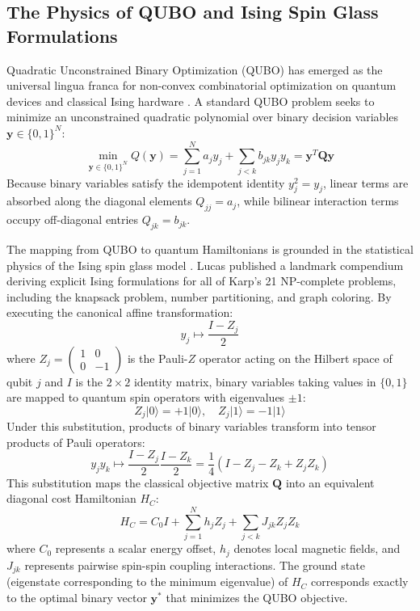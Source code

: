 \documentclass[11pt,a4paper]{article}
\theoremstyle{definition}
\theoremstyle{remark}
\begin{document}
\subsection{The Physics of QUBO and Ising Spin Glass Formulations}
Quadratic Unconstrained Binary Optimization (QUBO) has emerged as the universal lingua franca for non-convex combinatorial optimization on quantum devices and classical Ising hardware \cite{glover2019}. A standard QUBO problem seeks to minimize an unconstrained quadratic polynomial over binary decision variables $\mathbf{y} \in \{0, 1\}^N$:
\begin{equation}
\min_{\mathbf{y} \in \{0, 1\}^N} Q(\mathbf{y}) = \sum_{j=1}^N a_j y_j + \sum_{j < k} b_{jk} y_j y_k = \mathbf{y}^T \mathbf{Q} \mathbf{y}
\end{equation}
Because binary variables satisfy the idempotent identity $y_j^2 = y_j$, linear terms are absorbed along the diagonal elements $Q_{jj} = a_j$, while bilinear interaction terms occupy off-diagonal entries $Q_{jk} = b_{jk}$.

The mapping from QUBO to quantum Hamiltonians is grounded in the statistical physics of the Ising spin glass model \cite{lucas2014}. Lucas published a landmark compendium deriving explicit Ising formulations for all of Karp's 21 NP-complete problems, including the knapsack problem, number partitioning, and graph coloring. By executing the canonical affine transformation:
\begin{equation}
y_j \mapsto \frac{I - Z_j}{2}
\end{equation}
where $Z_j = \begin{pmatrix} 1 & 0 \\ 0 & -1 \end{pmatrix}$ is the Pauli-$Z$ operator acting on the Hilbert space of qubit $j$ and $I$ is the $2 \times 2$ identity matrix, binary variables taking values in $\{0, 1\}$ are mapped to quantum spin operators with eigenvalues $\pm 1$:
\begin{equation}
Z_j |0\rangle = +1 |0\rangle, \quad Z_j |1\rangle = -1 |1\rangle
\end{equation}
Under this substitution, products of binary variables transform into tensor products of Pauli operators:
\begin{equation}
y_j y_k \mapsto \frac{I - Z_j}{2} \frac{I - Z_k}{2} = \frac{1}{4} \left( I - Z_j - Z_k + Z_j Z_k \right)
\end{equation}
This substitution maps the classical objective matrix $\mathbf{Q}$ into an equivalent diagonal cost Hamiltonian $H_C$:
\begin{equation}
H_C = C_0 I + \sum_{j=1}^N h_j Z_j + \sum_{j < k} J_{jk} Z_j Z_k
\end{equation}
where $C_0$ represents a scalar energy offset, $h_j$ denotes local magnetic fields, and $J_{jk}$ represents pairwise spin-spin coupling interactions. The ground state (eigenstate corresponding to the minimum eigenvalue) of $H_C$ corresponds exactly to the optimal binary vector $\mathbf{y}^*$ that minimizes the QUBO objective.
\end{document}
